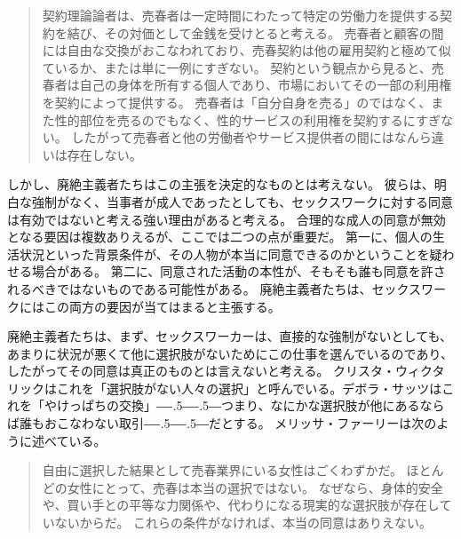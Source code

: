 \documentclass[paper=a4,book,openany]{jlreq}
\def\DDASH{―\kern-.5\zw―\kern-.5\zw―} %
\begin{document}
\begin{quote}
契約理論論者は、売春者は一定時間にわたって特定の労働力を提供する契約を結び、その対価として金銭を受けとると考える。
売春者と顧客の間には自由な交換がおこなわれており、売春契約は他の雇用契約と極めて似ているか、または単に一例にすぎない。
契約という観点から見ると、売春者は自己の身体を所有する個人であり、市場においてその一部の利用権を契約によって提供する。
売春者は「自分自身を売る」のではなく、また性的部位を売るのでもなく、性的サービスの利用権を契約するにすぎない。
したがって売春者と他の労働者やサービス提供者の間にはなんら違いは存在しない。
\citep[p.191]{pateman88:_sexual_contr}
\end{quote}

しかし、廃絶主義者たちはこの主張を決定的なものとは考えない。
彼らは、明白な強制がなく、当事者が成人であったとしても、セックスワークに対する同意は有効ではないと考える強い理由があると考える。
合理的な成人の同意が無効となる要因は複数ありえるが、ここでは二つの点が重要だ。
第一に、個人の生活状況といった背景条件が、その人物が本当に同意できるのかということを疑わせる場合がある。
第二に、同意された活動の本性が、そもそも誰も同意を許されるべきではないものである可能性がある。
廃絶主義者たちは、セックスワークにはこの両方の要因が当てはまると主張する。

廃絶主義者たちは、まず、セックスワーカーは、直接的な強制がないとしても、あまりに状況が悪くて他に選択肢がないためにこの仕事を選んでいるのであり、したがってその同意は真正のものとは言えないと考える。
クリスタ・ウィクタリックはこれを「選択肢がない人々の選択」と呼んでいる\citep[p.63]{wichterich00:_global_woman}。デボラ・サッツはこれを「やけっぱちの交換」{\DDASH}つまり、なにかな選択肢が他にあるならば誰もおこなわない取引{\DDASH}だとする\citep[p.71]{satz95:_market_women_sexual_labor}。
メリッサ・ファーリーは次のように述べている。

\begin{quote}
自由に選択した結果として売春業界にいる女性はごくわずかだ。
ほとんどの女性にとって、売春は本当の選択ではない。
なぜなら、身体的安全や、買い手との平等な力関係や、代わりになる現実的な選択肢が存在していないからだ。
これらの条件がなければ、本当の同意はありえない。
\citep{farley13:_prost_liber_slaver}
\end{quote}
\end{document}
